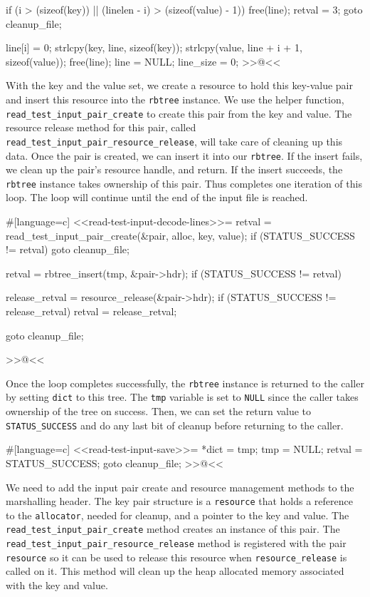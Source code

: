 {{        if (i > (sizeof(key)) || (linelen - i) > (sizeof(value) - 1))
        {
            free(line);
            retval = 3;
            goto cleanup_file;
        }

        line[i] = 0;
        strlcpy(key, line, sizeof(key));
        strlcpy(value, line + i + 1, sizeof(value));
        free(line);
        line = NULL;
        line_size = 0;
>>@<<

With the key and the value set, we create a resource to hold this key-value pair
and insert this resource into the \verb/rbtree/ instance. We use the helper
function, \verb/read_test_input_pair_create/ to create this pair from the key
and value.  The resource release method for this pair, called
\verb/read_test_input_pair_resource_release/, will take care of cleaning up this
data. Once the pair is created, we can insert it into our \verb/rbtree/. If the
insert fails, we clean up the pair's resource handle, and return. If the insert
succeeds, the \verb/rbtree/ instance takes ownership of this pair. Thus
completes one iteration of this loop. The loop will continue until the end of
the input file is reached.

#[language=c]
<<read-test-input-decode-lines>>=
        retval = read_test_input_pair_create(&pair, alloc, key, value);
        if (STATUS_SUCCESS != retval)
        {
            goto cleanup_file;
        }

        retval = rbtree_insert(tmp, &pair->hdr);
        if (STATUS_SUCCESS != retval)
        {
            release_retval = resource_release(&pair->hdr);
            if (STATUS_SUCCESS != release_retval)
            {
                retval = release_retval;
            }

            goto cleanup_file;
        }
    }
>>@<<

\newpage

Once the loop completes successfully, the \verb/rbtree/ instance is returned to
the caller by setting \verb/dict/ to this tree. The \verb/tmp/ variable is set
to \verb/NULL/ since the caller takes ownership of the tree on success. Then, we
can set the return value to \verb/STATUS_SUCCESS/ and do any last bit of cleanup
before returning to the caller.

#[language=c]
<<read-test-input-save>>=
    *dict = tmp;
    tmp = NULL;
    retval = STATUS_SUCCESS;
    goto cleanup_file;
>>@<<

We need to add the input pair create and resource management methods to the
marshalling header. The key pair structure is a \verb/resource/ that holds a
reference to the \verb/allocator/, needed for cleanup, and a pointer to the key
and value. The \verb/read_test_input_pair_create/ method creates an instance of
this pair. The \verb/read_test_input_pair_resource_release/ method is registered
with the pair \verb/resource/ so it can be used to release this resource when
\verb/resource_release/ is called on it. This method will clean up the heap
allocated memory associated with the key and value.

}
